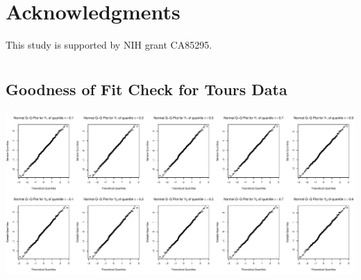 \documentclass[useAMS,usenatbib,referee]{biom}
\begin{document}

\section*{Acknowledgments}

This study is supported by NIH grant CA85295.






\appendix
\section{}

\subsection{Goodness of Fit Check for Tours Data}
\label{sec:goftours}

\centerline{\includegraphics[scale = .4 ]{../image/ToursGoF}}

\label{lastpage}
\end{document}
